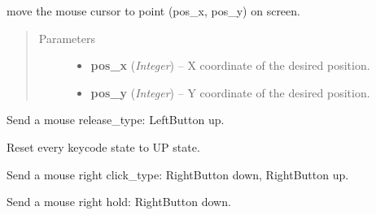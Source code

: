 \documentclass[letterpaper,10pt,english]{sphinxmanual}
\begin{document}
\begin{fulllineitems}
\label{macro:macro.move_to}
move the mouse cursor to point (pos\_x, pos\_y) on screen.
\begin{quote}\begin{description}
\item[{Parameters}] \leavevmode\begin{itemize}
\item {} 
\textbf{pos\_x} (\emph{Integer}) -- X coordinate of the desired position.

\item {} 
\textbf{pos\_y} (\emph{Integer}) -- Y coordinate of the desired position.

\end{itemize}

\end{description}\end{quote}

\end{fulllineitems}


\begin{fulllineitems}
\label{macro:macro.release}
Send a mouse release\_type: LeftButton up.

\end{fulllineitems}


\begin{fulllineitems}
\label{macro:macro.release_all_keys}
Reset every keycode state to UP state.

\end{fulllineitems}


\begin{fulllineitems}
\label{macro:macro.right_click}
Send a mouse right click\_type: RightButton down, RightButton up.

\end{fulllineitems}


\begin{fulllineitems}
\label{macro:macro.right_hold}
Send a mouse right hold: RightButton down.

\end{fulllineitems}
\end{document}
